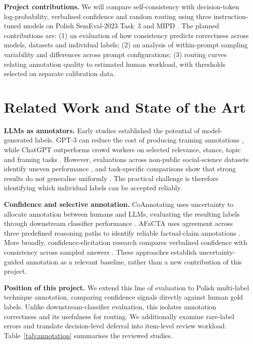 \documentclass[11pt]{article}
\begin{document}
\smallskip
\noindent\textbf{Project contributions.}
We will compare self-consistency with decision-token
log-probability, verbalised confidence and random routing
using three instruction-tuned models on Polish
SemEval-2023 Task~3 and MIPD
\cite{2023-semeval,mipd-2024}.
The planned contributions are:
(1) an evaluation of how consistency predicts correctness
across models, datasets and individual labels;
(2) an analysis of within-prompt sampling variability and
differences across prompt configurations;
(3) routing curves relating annotation quality to estimated
human workload, with thresholds selected on separate
calibration data.

\section{Related Work and State of the Art}

\noindent\textbf{LLMs as annotators.}
Early studies established the potential of model-generated
labels. GPT-3 can reduce the cost of producing training
annotations \cite{want-to-reduce-gpt3}, while ChatGPT
outperforms crowd workers on selected relevance, stance,
topic and framing tasks
\cite{chat-gpt-outperform-crowd}.
However, evaluations across non-public social-science
datasets identify uneven performance
\cite{keeping-humans-annot}, and task-specific comparisons
show that strong results do not generalise uniformly
\cite{are-chatbots-reliab}.
The practical challenge is therefore identifying which
individual labels can be accepted reliably.

\smallskip
\noindent\textbf{Confidence and selective annotation.}
CoAnnotating uses uncertainty to allocate annotation
between humans and LLMs, evaluating the resulting labels
through downstream classifier performance
\cite{coannotating-uncertainty}.
AFaCTA uses agreement across three predefined reasoning
paths to identify reliable factual-claim annotations
\cite{afacta-assist}.
More broadly, confidence-elicitation research compares
verbalised confidence with consistency across sampled
answers \cite{can-llm-expre}.
These approaches establish uncertainty-guided annotation
as a relevant baseline, rather than a new contribution
of this project.

\smallskip
\noindent\textbf{Position of this project.}
We extend this line of evaluation to Polish multi-label
technique annotation, comparing confidence signals
directly against human gold labels.
Unlike downstream-classifier evaluation, this isolates
annotation correctness and its usefulness for routing.
We additionally examine rare-label errors and translate
decision-level deferral into item-level review workload.
Table~\ref{tab:annotation} summarises the reviewed studies.
\end{document}
